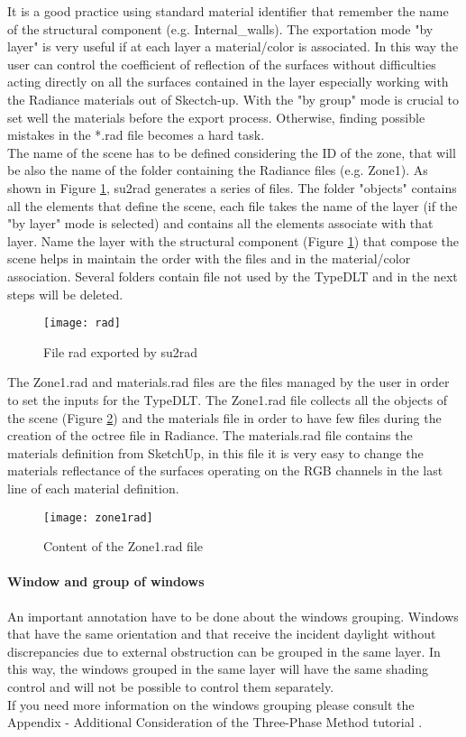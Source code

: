It is a good practice using standard material identifier that remember the name of the structural component (e.g. Internal\_walls). The exportation mode "by layer" is very useful if  at each layer a material/color is associated. In this way the user can control the coefficient of reflection of the surfaces without difficulties acting directly on all the surfaces contained in the layer especially working with the Radiance materials out of Skectch-up. With the "by group" mode is crucial to set well the materials before the export process. Otherwise, finding possible mistakes in the *.rad file becomes a hard task.\\
The name of the scene has to be defined considering the ID of the zone, that will be also the name of the folder containing the Radiance files (e.g. Zone1). As shown in Figure \ref{img2:rad}, su2rad generates a series of files. The folder "objects" contains all the elements that define the scene, each file takes the name of the layer (if the "by layer" mode is selected) and contains all the elements associate with that layer. Name the layer with the structural component (Figure \ref{img2:rad}) that compose the scene helps in maintain the order with the files and in the material/color association. Several folders contain file not used by the TypeDLT and in the next steps will be deleted.

\begin{figure}[h]
\centering
\texttt{[image: rad]}
\caption{\label{img2:rad} File rad exported by su2rad}
\end{figure}

The Zone1.rad and materials.rad files are the files managed by the user in order to set the inputs for the TypeDLT. The Zone1.rad file collects all the objects of the scene (Figure \ref{img2:zone1rad}) and the materials file in order to have few files during the creation of the octree file in Radiance. The materials.rad file contains the materials definition from SketchUp, in this file it is very easy to change the materials reflectance of the surfaces operating on the RGB channels in the last line of each material definition.

\begin{figure}[h]
\centering
\texttt{[image: zone1rad]}
\caption{\label{img2:zone1rad} Content of the Zone1.rad file}
\end{figure}

\paragraph{Window and group of windows} 
An important annotation have to be done about the windows grouping. Windows that have the same orientation and that receive the incident daylight without discrepancies due to external obstruction can be grouped in the same layer. In this way, the windows grouped in the same layer will have the same shading control and will not be possible to control them separately.  \\
If you need more information on the windows grouping please consult the Appendix - Additional Consideration of the Three-Phase Method tutorial \cite{3ph_tut}.


